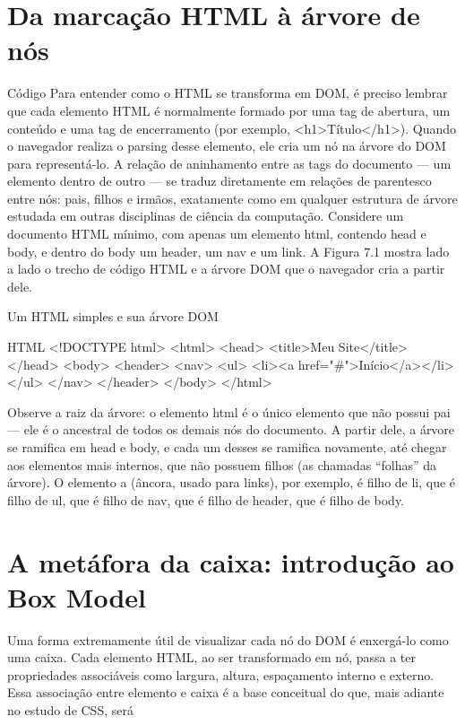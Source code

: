 \section{Da marcação HTML à árvore de nós}

\begin{codebox}{Código}
Para entender como o HTML se transforma em DOM, é preciso lembrar que cada
elemento HTML é normalmente formado por uma tag de abertura, um conteúdo e uma
tag de encerramento (por exemplo, <h1>Título</h1>). Quando o navegador realiza
o parsing desse elemento, ele cria um nó na árvore do DOM para representá-lo. A
relação de aninhamento entre as tags do documento — um elemento dentro de outro
— se traduz diretamente em relações de parentesco entre nós: pais, filhos e irmãos,
exatamente como em qualquer estrutura de árvore estudada em outras disciplinas de
ciência da computação.
Considere um documento HTML mínimo, com apenas um elemento html, contendo
head e body, e dentro do body um header, um nav e um link. A Figura 7.1 mostra
lado a lado o trecho de código HTML e a árvore DOM que o navegador cria a partir
dele.
\end{codebox}

Um HTML simples e sua árvore DOM

\begin{codebox}{HTML}
   <!DOCTYPE html>
   <html>
     <head>
       <title>Meu Site</title>
     </head>
     <body>
       <header>
          <nav>
            <ul>
              <li><a href="#">Início</a></li>
            </ul>
          </nav>
       </header>
     </body>
   </html>
\end{codebox}

Observe a raiz da árvore: o elemento html é o único elemento que não possui pai — ele é o ancestral de todos os demais nós do documento. A partir dele, a árvore se ramifica em head e body, e cada um desses se ramifica novamente, até chegar aos elementos mais internos, que não possuem filhos (as chamadas “folhas” da árvore). O elemento a (âncora, usado para links), por exemplo, é filho de li, que é filho de ul, que é filho de nav, que é filho de header, que é filho de body.

\section{A metáfora da caixa: introdução ao Box Model}

Uma forma extremamente útil de visualizar cada nó do DOM é enxergá-lo como uma caixa. Cada elemento HTML, ao ser transformado em nó, passa a ter propriedades associáveis como largura, altura, espaçamento interno e externo. Essa associação entre elemento e caixa é a base conceitual do que, mais adiante no estudo de CSS, será

